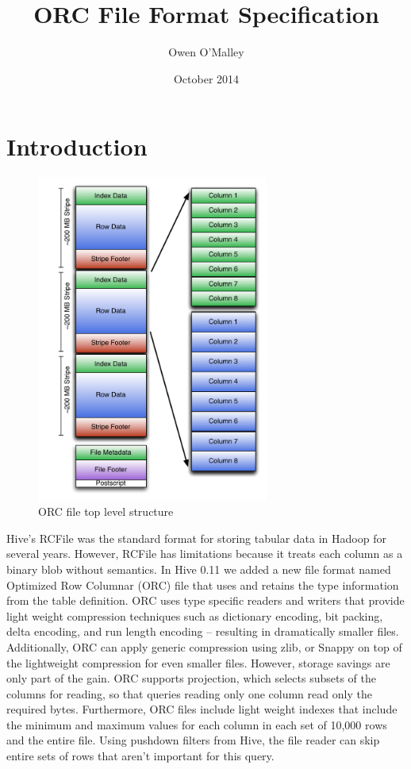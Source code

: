 \documentclass{article}
\title{ORC File Format Specification}
\author{Owen O'Malley}
\date{October 2014}
\begin{document}
\maketitle

\section{Introduction}

\begin{figure}
  \centering
  \includegraphics[width=3in]{ORCFileStructure.pdf}
  \caption{ORC file top level structure}
  \label{orc-structure}
\end{figure}

Hive's RCFile was the standard format for storing tabular data in
Hadoop for several years. However, RCFile has limitations because it
treats each column as a binary blob without semantics. In Hive 0.11 we
added a new file format named Optimized Row Columnar (ORC) file that
uses and retains the type information from the table definition. ORC
uses type specific readers and writers that provide light weight
compression techniques such as dictionary encoding, bit packing, delta
encoding, and run length encoding -- resulting in dramatically smaller
files. Additionally, ORC can apply generic compression using zlib, or
Snappy on top of the lightweight compression for even smaller
files. However, storage savings are only part of the gain. ORC
supports projection, which selects subsets of the columns for reading,
so that queries reading only one column read only the required
bytes. Furthermore, ORC files include light weight indexes that
include the minimum and maximum values for each column in each set of
10,000 rows and the entire file. Using pushdown filters from Hive, the
file reader can skip entire sets of rows that aren't important for
this query.
\end{document}
